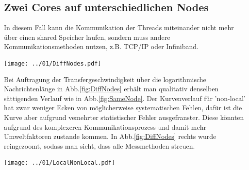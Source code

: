 \documentclass[12pt,a4paper]{article}
\begin{document}

\subsection{Zwei Cores auf unterschiedlichen Nodes}


In diesem Fall kann die Kommunikation der Threads miteinander nicht mehr über einen shared Speicher laufen, sondern muss andere Kommunikationsmethoden nutzen, z.B. TCP/IP oder Infiniband.\\

\begin{center}
	\centering
	\captionsetup{type=figure}
	\begin{minipage}{\linewidth}
		\texttt{[image: ../01/DiffNodes.pdf]}
	\end{minipage}
	\label{fig:DiffNodes}
\end{center}

Bei Auftragung der Transfergeschwindigkeit über die logarithmische Nachrichtenlänge in Abb.\ref{fig:DiffNodes} erhält man qualitativ denselben sättigenden Verlauf wie in Abb.\ref{fig:SameNode}. Der Kurvenverlauf für 'non-local' hat zwar weniger Ecken von möglicherweise systematischen Fehlen, dafür ist die Kurve aber aufgrund vemehrter statistischer Fehler ausgefranster. Diese könnten aufgrund des komplexeren Kommunikationsprozess und damit mehr Umweltfaktoren zustande kommen. In Abb.\ref{fig:DiffNodes} rechts wurde reingezoomt, sodass man sieht, dass alle Messmethoden streuen.

\begin{center}
	\centering
	\captionsetup{type=figure}
	\begin{minipage}{0.6\linewidth}
		\texttt{[image: ../01/LocalNonLocal.pdf]}
	\end{minipage}
	\label{fig:LocalNonLocal}
\end{center}
\end{document}
